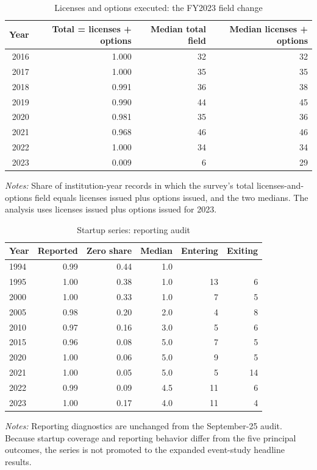 \begin{table}[htbp]\centering
\caption{Licenses and options executed: the FY2023 field change}\label{tab:licfield}
\begin{threeparttable}\footnotesize
\begin{tabular}{rrrr}\toprule
Year & Total = licenses + options & Median total field & Median licenses + options \\\midrule
2016 & 1.000 & 32 & 32 \\
2017 & 1.000 & 35 & 35 \\
2018 & 0.991 & 36 & 38 \\
2019 & 0.990 & 44 & 45 \\
2020 & 0.981 & 35 & 36 \\
2021 & 0.968 & 46 & 46 \\
2022 & 1.000 & 34 & 34 \\
2023 & 0.009 & 6 & 29 \\
\bottomrule
\end{tabular}
\begin{tablenotes}[flushleft]\footnotesize
\item \textit{Notes:} Share of institution-year records in which the survey's total licenses-and-options field equals licenses issued plus options issued, and the two medians. The analysis uses licenses issued plus options issued for 2023.
\end{tablenotes}
\end{threeparttable}
\end{table}

\begin{table}[htbp]\centering
\caption{Startup series: reporting audit}\label{tab:startups}
\begin{threeparttable}\footnotesize
\begin{tabular}{lrrrrr}\toprule
Year & Reported & Zero share & Median & Entering & Exiting \\\midrule
1994 & 0.99 & 0.44 & 1.0 &  &  \\
1995 & 1.00 & 0.38 & 1.0 & 13 & 6 \\
2000 & 1.00 & 0.33 & 1.0 & 7 & 5 \\
2005 & 0.98 & 0.20 & 2.0 & 4 & 8 \\
2010 & 0.97 & 0.16 & 3.0 & 5 & 6 \\
2015 & 0.96 & 0.08 & 5.0 & 7 & 5 \\
2020 & 1.00 & 0.06 & 5.0 & 9 & 5 \\
2021 & 1.00 & 0.05 & 5.0 & 5 & 14 \\
2022 & 0.99 & 0.09 & 4.5 & 11 & 6 \\
2023 & 1.00 & 0.17 & 4.0 & 11 & 4 \\
\bottomrule
\end{tabular}
\begin{tablenotes}[flushleft]\footnotesize
\item \textit{Notes:} Reporting diagnostics are unchanged from the September-25 audit. Because startup coverage and reporting behavior differ from the five principal outcomes, the series is not promoted to the expanded event-study headline results.
\end{tablenotes}
\end{threeparttable}
\end{table}
